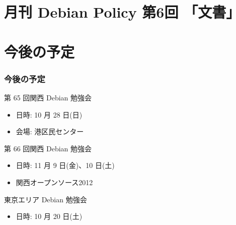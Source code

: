 \documentclass[cjk,dvipdfmx,10pt,%
hyperref={bookmarks=true,bookmarksnumbered=true,bookmarksopen=false,%
colorlinks=false,%
pdftitle={第 64 回 関西 Debian 勉強会},%
pdfauthor={倉敷・のがた・佐々木・かわだ},%
pdfsubject={資料},%
}]{beamer}
\begin{document}
\section{月刊 Debian Policy 第6回 「文書」}


\section{今後の予定}
\begin{frame}[fragile]
\frametitle{今後の予定}

\begin{block}{第 65 回関西 Debian 勉強会}
\begin{itemize}
  \item 日時: 10 月 28 日(日)
  \item 会場: 港区民センター
\end{itemize}
\end{block}

\begin{block}{第 66 回関西 Debian 勉強会}
\begin{itemize}
  \item 日時: 11 月 9 日(金)、10 日(土)
  \item 関西オープンソース2012
\end{itemize}
\end{block}

\begin{block}{東京エリア Debian 勉強会}
  \begin{itemize}
  \item 日時: 10 月 20 日(土)
  \end{itemize}
\end{block}

\end{frame}


\takahashi[50]{  }
\end{document}

